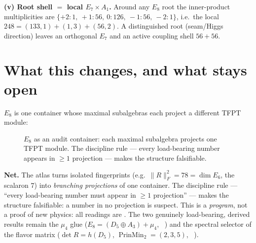 \documentclass[11pt,a4paper]{article}
\theoremstyle{definition}
\begin{document}
\par\smallskip\noindent\textbf{(v) Root shell $=$ local $E_7\times A_1$.}
Around any $E_8$ root the inner-product multiplicities are
$\{+2{:}1,\ +1{:}56,\ 0{:}126,\ -1{:}56,\ -2{:}1\}$, i.e.\ the local
$248=(133,1){+}(1,3){+}(56,2)$. A distinguished root (seam/Higgs direction) leaves an orthogonal $E_7$
and an active coupling shell $56{+}56$. \mE

\section{What this changes, and what stays open}
$E_8$ is one container whose maximal subalgebras each project a different TFPT module:

\begin{figure}[h]\centering
{}
\caption{\small $E_8$ as an audit container: each maximal subalgebra projects one TFPT module. The
discipline rule --- every load-bearing number appears in $\ge1$ projection --- makes the structure
falsifiable.}
\end{figure}

\par\smallskip\noindent\textbf{Net.}
The atlas turns isolated fingerprints (e.g.\ $\|R\|_F^2=78=\dim E_6$, the scalaron $7$) into
\emph{branching projections} of one container. The discipline rule --- ``every load-bearing number must
appear in $\ge1$ projection'' --- makes the structure falsifiable: a number in no projection is suspect.
This is a \emph{program}, not a proof of new physics: all readings are \mO. The two genuinely
load-bearing, derived results remain the $\mu_4$ glue ($E_8=(D_5\oplus A_3)+\mu_4$, \mE\ ) and the
spectral selector of the flavor matrix ($\det R=h(D_5)$, $\operatorname{PrinMin}_2=(2,3,5)$, \mE\ ).
\end{document}
